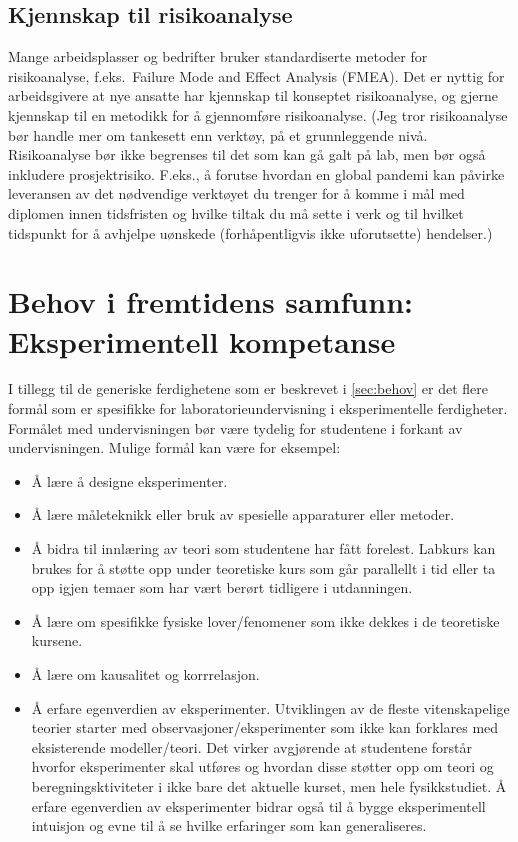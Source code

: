 \documentclass{article}
\begin{document}
\subsection{Kjennskap til risikoanalyse}
Mange arbeidsplasser og bedrifter bruker standardiserte metoder for risikoanalyse, f.eks.~Failure Mode and Effect Analysis (FMEA). Det er nyttig for arbeidsgivere at nye ansatte har kjennskap til konseptet risikoanalyse, og gjerne kjennskap til en metodikk for å gjennomføre risikoanalyse.
{\color{red}(Jeg tror risikoanalyse bør handle mer om tankesett enn verktøy, på et grunnleggende nivå.  Risikoanalyse bør ikke begrenses til det som kan gå galt på lab, men bør også inkludere prosjektrisiko. F.eks., å forutse hvordan en global pandemi kan påvirke leveransen av det nødvendige verktøyet du trenger for å komme i mål med diplomen innen tidsfristen og hvilke tiltak du må sette i verk og til hvilket tidspunkt for å avhjelpe uønskede (forhåpentligvis ikke uforutsette) hendelser.)}

\section{Behov i fremtidens samfunn: Eksperimentell kompetanse}
\label{sec:behov-exp}
I tillegg til de generiske ferdighetene som er beskrevet i \cref{sec:behov} er det flere formål som er spesifikke for laboratorieundervisning i eksperimentelle ferdigheter. Formålet med undervisningen bør være tydelig for studentene i forkant av undervisningen. Mulige formål kan være for eksempel:
\begin{itemize}
  \item Å lære å designe eksperimenter.
  \item Å lære måleteknikk eller bruk av spesielle apparaturer eller metoder.
  \item Å bidra til innlæring av teori som studentene har fått forelest. Labkurs kan brukes for å støtte opp under teoretiske kurs som går parallellt i tid eller ta opp igjen temaer som har vært berørt tidligere i utdanningen.
  \item Å lære om spesifikke fysiske lover/fenomener som
    ikke dekkes i de teoretiske kursene.
  \item Å lære om kausalitet og korrrelasjon.
  \item Å erfare egenverdien av eksperimenter. Utviklingen av de fleste vitenskapelige teorier starter med observasjoner/eksperimenter som ikke kan forklares med eksisterende modeller/teori.
    Det virker avgjørende at studentene forstår hvorfor eksperimenter skal utføres og hvordan disse støtter opp om teori og beregningsktiviteter i ikke bare det aktuelle kurset, men hele fysikkstudiet. Å erfare egenverdien av eksperimenter bidrar også til å bygge eksperimentell intuisjon og evne til å se hvilke erfaringer som kan generaliseres.
\end{itemize}
\end{document}
